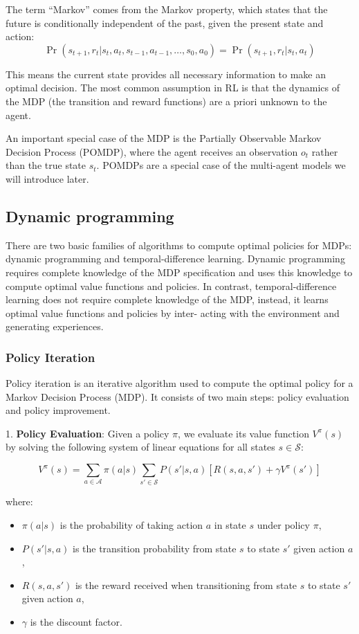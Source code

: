 The term “Markov” comes from the Markov property, which states that the future is conditionally independent of the past, given the present state and action:
$$
\Pr(s_{t+1}, r_t | s_t, a_t, s_{t-1}, a_{t-1}, \dots, s_0, a_0) = \Pr(s_{t+1}, r_t | s_t, a_t)
$$

This means the current state provides all necessary information to make an optimal decision. The most common assumption in RL is that the dynamics of the MDP (the transition and reward functions) are a priori unknown to the agent.

An important special case of the MDP is the Partially Observable Markov Decision Process (POMDP), where the agent receives an observation $o_t$ rather than the true state $s_t$. POMDPs are a special case of the multi-agent models we will introduce later.

\subsection{Dynamic programming}
There are two basic families of algorithms to compute optimal policies for MDPs: dynamic programming and temporal-difference learning.
Dynamic programming requires complete knowledge of the MDP specification
and uses this knowledge to compute optimal value functions and policies. In
contrast, temporal-difference learning does not require complete knowledge
of the MDP, instead, it learns optimal value functions and policies by inter-
acting with the environment and generating experiences.

\subsubsection{Policy Iteration}

Policy iteration is an iterative algorithm used to compute the optimal policy for a Markov Decision Process (MDP). It consists of two main steps: policy evaluation and policy improvement.

1. \textbf{Policy Evaluation}: Given a policy \(\pi\), we evaluate its value function \(V^\pi(s)\) by solving the following system of linear equations for all states \(s \in \mathcal{S}\):

\[
V^\pi(s) = \sum_{a \in \mathcal{A}} \pi(a|s) \sum_{s' \in \mathcal{S}} P(s'|s, a) \left[ R(s, a, s') + \gamma V^\pi(s') \right]
\]

where:
\begin{itemize}
    \item \(\pi(a|s)\) is the probability of taking action \(a\) in state \(s\) under policy \(\pi\),
    \item \(P(s'|s, a)\) is the transition probability from state \(s\) to state \(s'\) given action \(a\),
    \item \(R(s, a, s')\) is the reward received when transitioning from state \(s\) to state \(s'\) given action \(a\),
    \item \(\gamma\) is the discount factor.
\end{itemize}

